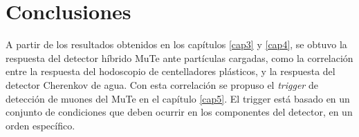 \documentclass[12pt,oneside,openany,letter]{book}
\begin{document}

\chapter{Conclusiones}\label{cap6}
A partir de los resultados obtenidos en los cap\'itulos \ref{cap3} y \ref{cap4}, se obtuvo la respuesta del detector h\'ibrido MuTe ante part\'iculas cargadas, como la correlaci\'on entre la respuesta del hodoscopio de centelladores pl\'asticos, y la respuesta del detector Cherenkov de agua. Con esta correlaci\'on se propuso el \textit{trigger} de detecci\'on de muones del MuTe en el cap\'itulo \ref{cap5}. El trigger est\'a basado en un conjunto de condiciones que deben ocurrir en los componentes del detector, en un orden espec\'ifico. 
\end{document}
